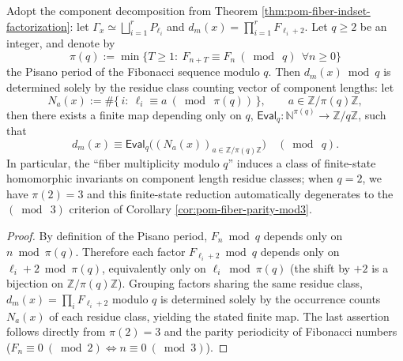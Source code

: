 \begin{corollary}\label{cor:pom-fiber-modq-pisano-invariant}
Adopt the component decomposition from Theorem \ref{thm:pom-fiber-indset-factorization}: let
\(
\Gamma_x\simeq\bigsqcup_{i=1}^r P_{\ell_i}
\)
and
\(
d_m(x)=\prod_{i=1}^r F_{\ell_i+2}
\).
Let \(q\ge 2\) be an integer, and denote by
\[
\pi(q):=\min\{T\ge 1:\ F_{n+T}\equiv F_n\ (\bmod\ q)\ \ \forall n\ge 0\}
\]
the Pisano period of the Fibonacci sequence modulo \(q\).
Then \(d_m(x)\bmod q\) is determined solely by the residue class counting vector of component lengths: let
\[
N_a(x):=\#\{\,i:\ \ell_i\equiv a\ (\bmod\ \pi(q))\,\},
\qquad a\in \mathbb{Z}/\pi(q)\mathbb{Z},
\]
then there exists a finite map depending only on \(q\),
\(
\mathsf{Eval}_q:\mathbb{N}^{\pi(q)}\to \mathbb{Z}/q\mathbb{Z}
\),
such that
\[
\boxed{\;
d_m(x)\equiv \mathsf{Eval}_q\bigl((N_a(x))_{a\in\mathbb{Z}/\pi(q)\mathbb{Z}}\bigr)\quad(\bmod\ q).\;}
\]
In particular, the ``fiber multiplicity modulo \(q\)'' induces a class of finite-state homomorphic invariants on component length residue classes;
when \(q=2\), we have \(\pi(2)=3\) and this finite-state reduction automatically degenerates to the \((\bmod\ 3)\) criterion of Corollary \ref{cor:pom-fiber-parity-mod3}.
\end{corollary}
\begin{proof}
By definition of the Pisano period, \(F_n\bmod q\) depends only on \(n\bmod \pi(q)\).
Therefore each factor \(F_{\ell_i+2}\bmod q\) depends only on \(\ell_i+2\bmod \pi(q)\), equivalently only on \(\ell_i\bmod \pi(q)\) (the shift by \(+2\) is a bijection on \(\mathbb{Z}/\pi(q)\mathbb{Z}\)).
Grouping factors sharing the same residue class,
\(
d_m(x)=\prod_i F_{\ell_i+2}
\)
modulo \(q\) is determined solely by the occurrence counts \(N_a(x)\) of each residue class, yielding the stated finite map.
The last assertion follows directly from \(\pi(2)=3\) and the parity periodicity of Fibonacci numbers (\(F_n\equiv 0\ (\bmod 2)\iff n\equiv 0\ (\bmod 3)\)).
\end{proof}

\endinput
